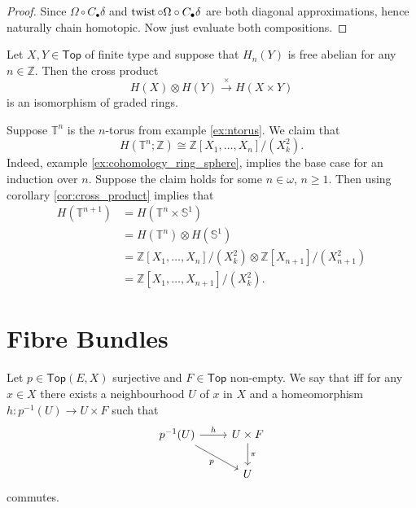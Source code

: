 \begin{proof}
	Since $\Omega \circ C_\bullet \delta$ and $\operatorname{twist} \circ \Omega \circ C_\bullet\delta$ are both diagonal approximations, hence naturally chain homotopic. Now just evaluate both compositions.
\end{proof}

\begin{corollary}
	\label{cor:cross_product}
	Let $X,Y \in \mathsf{Top}$ of finite type and suppose that $H_n(Y)$ is free abelian for any $n \in \mathbb{Z}$. Then the cross product
	\begin{equation*}
		H(X) \otimes H(Y) \overset{\times}{\to} H(X \times Y)
	\end{equation*}
	\noindent is an isomorphism of graded rings.
\end{corollary}

\begin{example}
	Suppose $\mathbb{T}^n$ is the $n$-torus from example \ref{ex:ntorus}. We claim that
	\begin{equation*}
		H(\mathbb{T}^n;\mathbb{Z}) \cong \mathbb{Z}[X_1,\dots,X_n]/(X^2_k).
	\end{equation*}
	Indeed, example \ref{ex:cohomology_ring_sphere}, implies the base case for an induction over $n$. Suppose the claim holds for some $n \in \omega$, $n \geq 1$. Then using corollary \ref{cor:cross_product} implies that
	\begin{align*}
		H(\mathbb{T}^{n + 1}) &= H(\mathbb{T}^n \times \mathbb{S}^1)\\
		&= H(\mathbb{T}^n) \otimes H(\mathbb{S}^1)\\
		&= \mathbb{Z}[X_1,\dots,X_n]/(X^2_k) \otimes \mathbb{Z}[X_{n + 1}]/(X^2_{n + 1})\\
		&= \mathbb{Z}[X_1,\dots,X_{n + 1}]/(X^2_k).
	\end{align*}
\end{example}

\section*{Fibre Bundles}

\begin{definition}
	Let $p \in \mathsf{Top}(E,X)$ surjective and $F \in \mathsf{Top}$ non-empty. We say that  iff for any $x \in X$ there exists a neighbourhood $U$ of $x$ in $X$ and a homeomorphism $h : p^{-1}(U) \to U \times F$ such that
	\begin{equation*}
		\begin{tikzcd}
			p^{-1}(U) \arrow[dr,"p"']\arrow[r,"h"] & U \times F\arrow[d,"\pi"]\\
			& U
		\end{tikzcd}
	\end{equation*}
	\noindent commutes.
\end{definition}

